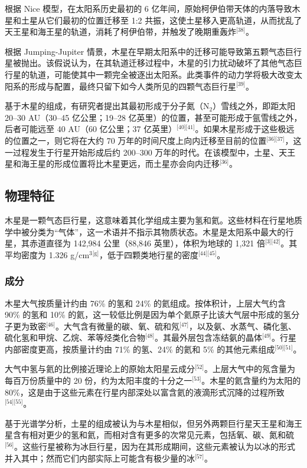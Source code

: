 根据 Nice 模型，在太阳系历史最初的 6 亿年间，原始柯伊伯带天体的内落导致木星和土星从它们最初的位置迁移至 1:2 共振，这使土星移入更高轨道，从而扰乱了天王星和海王星的轨道，消耗了柯伊伯带，并触发了晚期重轰炸\(^\text{[38]}\)。

根据 Jumping-Jupiter 情景，木星在早期太阳系中的迁移可能导致第五颗气态巨行星被抛出。该假说认为，在其轨道迁移过程中，木星的引力扰动破坏了其他气态巨行星的轨道，可能使其中一颗完全被逐出太阳系。此类事件的动力学将极大改变太阳系的形成与配置，最终只留下如今人类所见的四颗气态巨行星\(^\text{[39]}\)。

基于木星的组成，有研究者提出其最初形成于分子氮（N\(_2\)）雪线之外，即距太阳 20–30 AU（30–45 亿公里；19–28 亿英里）的位置，甚至可能形成于氩雪线之外，后者可能远至 40 AU（60 亿公里；37 亿英里）\(^\text{[40][41]}\)。如果木星形成于这些极远的位置之一，则它将在大约 70 万年的时间尺度上向内迁移至目前的位置\(^\text{[36][37]}\)，这一过程发生于行星开始形成后约 200–300 万年的时代。在该模型中，土星、天王星和海王星的形成位置将比木星更远，而土星亦会向内迁移\(^\text{[36]}\)。
\subsection{物理特征}
木星是一颗气态巨行星，这意味着其化学组成主要为氢和氦。这些材料在行星地质学中被分类为“气体”，这一术语并不指示其物质状态。木星是太阳系中最大的行星，其赤道直径为 142,984 公里（88,846 英里），体积为地球的 1,321 倍\(^\text{[3][42]}\)。其平均密度为 1.326 g/cm\(^3\)\(^\text{[g]}\)，低于四颗类地行星的密度\(^\text{[44][45]}\)。
\subsubsection{成分}
木星大气按质量计约由 76\% 的氢和 24\% 的氦组成。按体积计，上层大气约含 90\% 的氢和 10\% 的氦，这一较低比例是因为单个氦原子比该大气层中形成的氢分子更为致密\(^\text{[46]}\)。大气含有微量的碳、氧、硫和氖\(^\text{[47]}\)，以及氨、水蒸气、磷化氢、硫化氢和甲烷、乙烷、苯等烃类化合物\(^\text{[48]}\)。其最外层包含冻结氨的晶体\(^\text{[49]}\)。行星内部密度更高，按质量计约由 71\% 的氢、24\% 的氦和 5\% 的其他元素组成\(^\text{[50][51]}\)。

大气中氢与氦的比例接近理论上的原始太阳星云成分\(^\text{[52]}\)。上层大气中的氖含量为每百万份质量中的 20 份，约为太阳丰度的十分之一\(^\text{[53]}\)。木星的氦含量约为太阳的 80\%，这是由于这些元素在行星内部深处以富含氦的液滴形式沉降的过程所致\(^\text{[54][55]}\)。

基于光谱学分析，土星的组成被认为与木星相似，但另外两颗巨行星天王星和海王星含有相对更少的氢和氦，而相对含有更多的次常见元素，包括氧、碳、氮和硫\(^\text{[56]}\)。这些行星被称为冰巨行星，因为在其形成期间，这些元素被认为以冰的形式并入其中；然而它们内部实际上可能含有极少量的冰\(^\text{[57]}\)。
